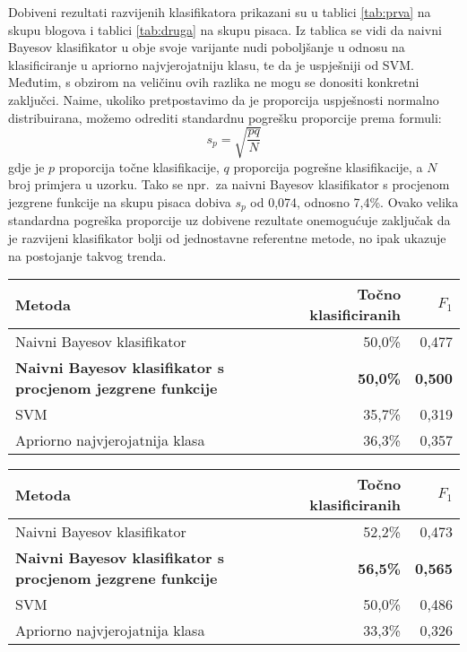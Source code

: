 \documentclass[10pt, a4paper]{article}
\begin{document}
Dobiveni rezultati razvijenih klasifikatora prikazani su u tablici \ref{tab:prva} na skupu blogova i tablici \ref{tab:druga} na skupu pisaca. Iz tablica se vidi da naivni Bayesov klasifikator u obje svoje varijante nudi poboljšanje u odnosu na klasificiranje u apriorno najvjerojatniju klasu, te da je uspješniji od SVM. Međutim, s obzirom na veličinu ovih razlika ne mogu se donositi konkretni zaključci. Naime, ukoliko pretpostavimo da je proporcija uspješnosti normalno distribuirana, možemo odrediti standardnu pogrešku proporcije prema formuli:
\[
s_p = \sqrt{\frac{pq}{N}}
\]
\noindent gdje je $p$ proporcija točne klasifikacije, $q$ proporcija pogrešne klasifikacije, a $N$ broj primjera u uzorku. Tako se npr.~za naivni Bayesov klasifikator s procjenom jezgrene funkcije na skupu pisaca dobiva $s_p$ od 0,074, odnosno 7,4\%. Ovako velika standardna pogreška proporcije uz dobivene rezultate onemogućuje zaključak da je razvijeni klasifikator bolji od jednostavne referentne metode, no ipak ukazuje na postojanje takvog trenda.

\begin{table*}
\caption{Postotak točno klasificiranih primjera  i  $F_1$ mjera na skupu blogova korištenjem različitih algoritama.}
\label{tab:prva}
\begin{center}
\begin{tabular}{lrr}
\toprule
Metoda & Točno klasificiranih & $F_1$ \\
\midrule
Naivni Bayesov klasifikator & 50,0\% & 0,477\\
 \textbf{Naivni Bayesov klasifikator s procjenom jezgrene funkcije}   & \textbf{50,0\%} &  \textbf{0,500}\\
SVM   & 35,7\% & 0,319\\
Apriorno najvjerojatnija klasa & 36,3\% & 0,357\\
\bottomrule
\end{tabular}
\end{center}
\end{table*}



\begin{table*}
\caption{Postotak točno klasificiranih primjera  i $F_1$ mjera na skupu pisaca korištenjem različitih algoritama. }
\label{tab:druga}
\begin{center}
\begin{tabular}{lrr}
\toprule
Metoda & Točno klasificiranih &  $F_1$\\
\midrule
Naivni Bayesov klasifikator & 52,2\% & 0,473\\
 \textbf{Naivni Bayesov klasifikator s procjenom jezgrene funkcije} &  \textbf{56,5\%} & \textbf{0,565}\\
SVM & 50,0\% & 0,486\\
Apriorno najvjerojatnija klasa & 33,3\% & 0,326\\
\bottomrule
\end{tabular}
\end{center}
\end{table*}
\end{document}
